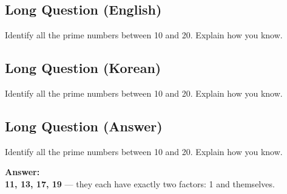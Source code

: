 \cleardoublepage
\subsection*{Long Question (English)}
Identify all the prime numbers between 10 and 20. Explain how you know.


\newpage
\subsection*{Long Question (Korean)}
Identify all the prime numbers between 10 and 20. Explain how you know.


\newpage
\subsection*{Long Question (Answer)}
Identify all the prime numbers between 10 and 20. Explain how you know.

\textbf{Answer:}\\
\textbf{11, 13, 17, 19} — they each have exactly two factors: 1 and themselves.
